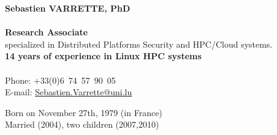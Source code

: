 \documentclass{cv}
\begin{document}
\begin{chapeau}
    \begin{adresse}
        {\Large\textbf{Sebastien VARRETTE, PhD}}\\
        \ligne\\
        \textbf{Research Associate}\\
        specialized in Distributed Platforms Security and HPC/Cloud systems.\\
        \textbf{14 years of experience in Linux HPC systems}\\
        \ligne\\
        Phone: +33(0)6~74~57~90~05\\
        E-mail:    \url{Sebastien.Varrette@uni.lu}\\
    \end{adresse}
    \begin{etatcivil}

        Born on November 27th, 1979 (in France)\\
        Married (2004), two children (2007,2010)\\
    \end{etatcivil}
\end{chapeau}
\end{document}
